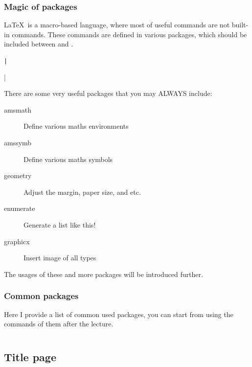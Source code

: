 \begin{frame}[fragile]
	\frametitle{Magic of packages}
	\LaTeX\ is a macro-based language, where most of useful commands are not built-in commands. These commands are defined in various packages, which should be included between \LC{\documentclass} and \LC{}.
	\begin{command}
		\texttt|\usepackage[options]{package}|
	\end{command}
	There are some very useful packages that you may \alert{ALWAYS} include:
	\begin{description}
		\item[amsmath] Define various maths environments
		\item[amssymb] Define various maths symbols
		\item[geometry] Adjust the margin, paper size, and etc.
		\item[enumerate] Generate a list like this!
		\item[graphicx] Insert image of all types
	\end{description}
	The usages of these and more packages will be introduced further.
\end{frame}

\begin{frame}[fragile]
	\frametitle{Common packages}
	Here I provide a list of common used packages, you can start from using the commands of them after the lecture.

	\inputminted{latex}{examples/packages.tex}
\end{frame}

\subsection{Title page}

